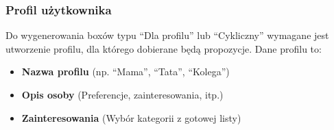 \documentclass[a4paper, 12pt]{article}
\begin{document}
\subsubsection{Profil użytkownika}
Do wygenerowania boxów typu ``Dla profilu'' lub ``Cykliczny'' wymagane jest utworzenie profilu, dla którego dobierane będą propozycje. Dane profilu to:
\begin{itemize}
    \item \textbf{Nazwa profilu} (np. ``Mama'', ``Tata'', ``Kolega'')
    \item \textbf{Opis osoby} (Preferencje, zainteresowania, itp.)
    \item \textbf{Zainteresowania} (Wybór kategorii z gotowej listy)
\end{itemize}

\newpage
\end{document}
